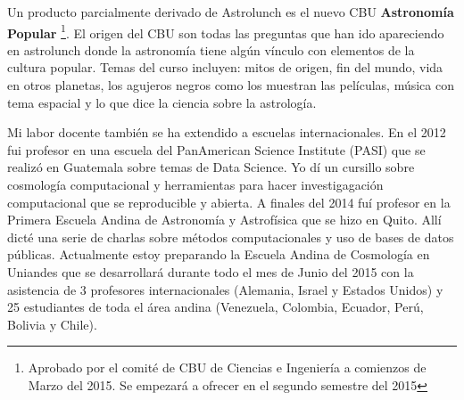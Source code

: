 \documentclass{report}
\begin{document}
Un producto parcialmente derivado de Astrolunch es el nuevo CBU {\bf Astronomía
Popular} \footnote{Aprobado por el comit\'e de CBU de Ciencias e
  Ingenier\'ia a comienzos de Marzo del 2015. Se empezar\'a a ofrecer
  en el segundo semestre del 2015}. El origen del CBU son todas las
preguntas que han ido apareciendo en astrolunch donde la astronom\'ia
tiene alg\'un v\'inculo con elementos de la cultura popular. Temas del
curso incluyen: mitos de origen, fin del mundo, vida en otros planetas,
los agujeros negros como los muestran las películas, música con tema
espacial y lo que dice la ciencia sobre la astrología.

Mi labor docente también se ha extendido a escuelas
internacionales. En el 2012 fui profesor en una escuela del
PanAmerican Science Institute (PASI) que se realizó en Guatemala sobre
temas de Data Science. Yo dí un cursillo sobre cosmología
computacional y herramientas para hacer investigagación computacional
que se reproducible y abierta. A finales del 2014 fuí profesor en la
Primera Escuela Andina de Astronomía y Astrofísica que se hizo en
Quito. Allí dicté una serie de charlas sobre métodos computacionales y
uso de bases de datos públicas. Actualmente estoy preparando la
Escuela Andina de Cosmología en Uniandes que se desarrollará durante
todo el mes de Junio del 2015 con la asistencia de 3 profesores
internacionales (Alemania, Israel y Estados Unidos) y 25 estudiantes
de toda el área andina (Venezuela, Colombia, Ecuador, Perú, Bolivia y
Chile). 
\end{document}

